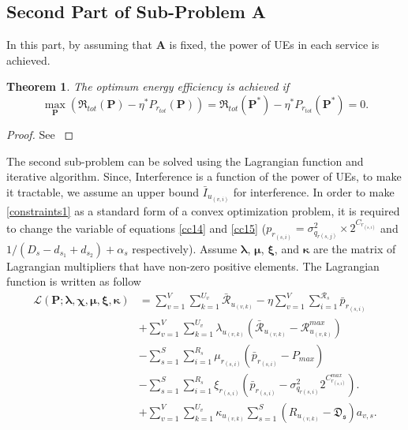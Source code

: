 \documentclass[conference]{IEEEtran}
\newtheorem{theorem}{Theorem}
\begin{document}
\subsection{Second Part of Sub-Problem A}\label{secondsub}
In this part, by assuming that $\boldsymbol{A}$ is fixed, the power of UEs in each service is achieved.
\begin{theorem}\label{t2}
The optimum energy efficiency is achieved if
\begin{equation}\label{q2}
\max \limits_{\boldsymbol{P}} (\mathfrak{R}_{tot}(\boldsymbol{P}) - \eta^* P_{r_{tot}}(\boldsymbol{P}))=
 \mathfrak{R}_{tot}(\boldsymbol{P}^*) - \eta^* P_{r_{tot}}(\boldsymbol{P}^*) =0.
\end{equation}
\end{theorem}
\begin{proof}
See \cite[Appendix A]{aaa}
\end{proof}
The second sub-problem can  be solved using the Lagrangian function and iterative algorithm.
Since, Interference is a function of the power of UEs, to make it tractable, we assume an upper bound $\bar{I}_{u_{(v,i)}}$ for interference. In order to make \eqref{constraints1} as a standard form of a convex optimization problem, it is required to change the variable of equations \eqref{cc14} and \eqref{cc15} ($p_{r_{(s,i)}} = \sigma_{q_{r(s,j)}}^2\times 2^{C_{r_{(s,i)}}}$ and $1/(D_{s}- d_{s_1} + d_{s_2})+\alpha_s$ respectively).
Assume $\boldsymbol{\lambda}$, $\boldsymbol{\mu}$, $\boldsymbol{\xi}$, and $\boldsymbol{ \kappa}$ are the matrix of Lagrangian multipliers that have non-zero positive elements.
The Lagrangian function is written as follow
\begin{equation}\label{lagrang}
\begin{split}
\mathcal{L}(\boldsymbol{P}; \boldsymbol{\lambda}, \boldsymbol{\chi}, \boldsymbol{\mu}, \boldsymbol{ \xi}, \boldsymbol{ \kappa}) & = \sum\limits_{v=1}^{V} \sum\limits_{k=1}^{U_v}\mathcal{\bar{R}}_{u_{(v,k)}}
- \eta \sum\limits_{v=1}^{V} \sum\limits_{i=1}^{\mathcal{R}_s}\bar{p}_{r_{(s,i)}}\\
&+\sum\limits_{v=1}^{V} \sum\limits_{k=1}^{U_v} \lambda_{u_{(v,k)}} (\mathcal{\bar{R}}_{u_{(v,k)}}-\mathcal{R}_{u_{(v,k)}}^{max})\\
&- \sum\limits_{s=1}^{S} \sum\limits_{i=1}^{R_s} \mu_{r_{(s,i)}} (\bar{p}_{r_{(s,i)}}-P_{max})\\
&- \sum\limits_{s=1}^{S} \sum\limits_{i=1}^{R_s} \xi_{r_{(s,i)}} (\bar{p}_{r_{(s,i)}}-\sigma_{q_{r(s,i)}}^2 2^{C_{r_{(s,i)}}^{max}}).\\
&+ \sum\limits_{v=1}^{V} \sum\limits_{k=1}^{U_v} \kappa_{u_{(v,k)}} \sum\limits_{s=1}^{S}(R_{u_{(v,k)}} -\mathfrak{D_s})a_{v,s}.\\
\end{split}
\end{equation}
\end{document}
